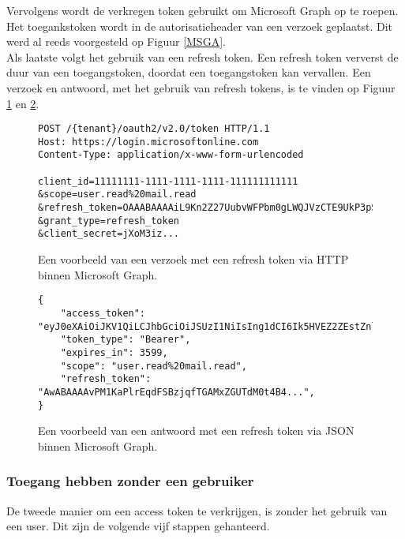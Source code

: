 Vervolgens wordt de verkregen token gebruikt om Microsoft Graph op te roepen. Het toegankstoken wordt in de autorisatieheader van een verzoek geplaatst. Dit werd al reeds voorgesteld op Figuur \ref{MSGA}. \\

Als laatste volgt het gebruik van een refresh token. Een refresh token ververst de duur van een toegangstoken, doordat een toegangstoken kan vervallen. Een verzoek en antwoord, met het gebruik van refresh tokens, is te vinden op Figuur \ref{MSGRTR} en \ref{MSGRTRES}.

\begin{figure}[!h]
    \footnotesize\begin{verbatim}
POST /{tenant}/oauth2/v2.0/token HTTP/1.1
Host: https://login.microsoftonline.com
Content-Type: application/x-www-form-urlencoded

client_id=11111111-1111-1111-1111-111111111111
&scope=user.read%20mail.read
&refresh_token=OAAABAAAAiL9Kn2Z27UubvWFPbm0gLWQJVzCTE9UkP3pSx1aXxUjq...
&grant_type=refresh_token
&client_secret=jXoM3iz...   
    \end{verbatim}    
    \caption[Voorbeeld Refresh Token request Microsoft Graph]{Een voorbeeld van een verzoek met een refresh token via \ac{HTTP} binnen Microsoft Graph.}
    \label{MSGRTR}
\end{figure}

\begin{figure}[!h]
    \footnotesize\begin{verbatim}
{
    "access_token": "eyJ0eXAiOiJKV1QiLCJhbGciOiJSUzI1NiIsIng1dCI6Ik5HVEZ2ZEstZnl0aEV1Q...",
    "token_type": "Bearer",
    "expires_in": 3599,
    "scope": "user.read%20mail.read",
    "refresh_token": "AwABAAAAvPM1KaPlrEqdFSBzjqfTGAMxZGUTdM0t4B4...",
}    
    \end{verbatim}    
    \caption[Voorbeeld Refresh Token response Microsoft Graph]{Een voorbeeld van een antwoord met een refresh token via \ac{JSON} binnen Microsoft Graph.}
    \label{MSGRTRES}
\end{figure}



\subsubsection{Toegang hebben zonder een gebruiker}

De tweede manier om een access token te verkrijgen, is zonder het gebruik van een user. Dit zijn de volgende vijf stappen gehanteerd. \\

